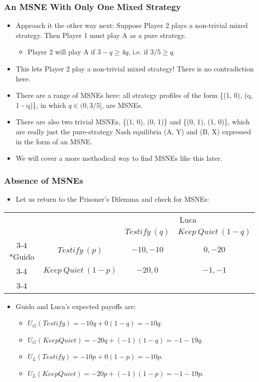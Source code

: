 \begin{frame}
\frametitle{An MSNE With Only One Mixed Strategy}
\begin{itemize}
\item Approach it the other way next: Suppose Player 2 plays a non-trivial mixed strategy. Then Player 1 must play A as a pure strategy.
\begin{itemize}
	\item Player 2 will play A if $3 - q \geq 4q$, i.e. if $3/5 \geq q$.
\end{itemize}
\item This lets Player 2 play a non-trivial mixed strategy! There is no contradiction here.
\item There are a range of MSNEs here: all strategy profiles of the form \{(1, 0), (q, 1 - q)\}, in which $q \in (0, 3/5]$, are MSNEs.
\item There are also two trivial MSNEs, \{(1, 0), (0, 1)\} and \{(0, 1), (1, 0)\}, which are really just the pure-strategy Nash equilibria (A, Y) and (B, X) expressed in the form of an MSNE.
\item We will cover a more methodical way to find MSNEs like this later.
\end{itemize}
\end{frame}

\begin{frame}
\frametitle{Absence of MSNEs}
\begin{itemize}
	\item Let us return to the Prisoner's Dilemma and check for MSNEs:
\end{itemize}
\begin{table}[h]
	\centering
	\begin{tabular}{cc|c|c|}
		& \multicolumn{1}{c}{} & \multicolumn{2}{c}{Luca}\\
		& \multicolumn{1}{c}{} & \multicolumn{1}{c}{$Testify~(q)$}  & \multicolumn{1}{c}{$Keep~Quiet~(1-q)$} \\\cline{3-4}
		\multirow{2}*{Guido}  & $Testify~(p)$ & $-10,-10$ & $0,-20$ \\\cline{3-4}
		& $Keep~Quiet~(1-p)$ & $-20,0$ & $-1,-1$ \\\cline{3-4}
	\end{tabular}
\end{table}
\begin{itemize}
	\item Guido and Luca's expected payoffs are:
	\begin{itemize}
		\item $U_G(Testify) = -10q + 0(1 - q) = -10q$.
		\item $U_G(Keep Quiet) = -20q + (-1)(1 - q) = -1 - 19q$.
		\item $U_L(Testify) = -10p + 0(1 - p) = -10p$.
		\item $U_L(Keep Quiet) = -20p + (-1)(1 - p) = -1 - 19p$.
	\end{itemize}
\end{itemize}
\end{frame}

